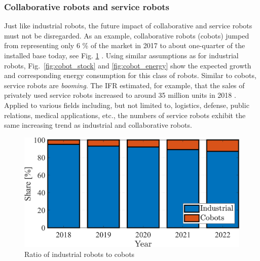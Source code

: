 \subsubsection{Collaborative robots and service robots}
Just like industrial robots, the future impact of collaborative and service robots must not be disregarded. As an example, collaborative robots (cobots) jumped from representing only 6 \% of the market in 2017 to about one-quarter of the installed base today, see Fig. \ref{fig:industrial_cobot_share} \cite{tobe2015}. Using similar assumptions as for industrial robots, Fig.~\ref{fig:cobot_stock} and \ref{fig:cobot_energy} show the expected growth and corresponding energy consumption for this class of robots. Similar to cobots, service robots are \textit{booming}. The IFR estimated, for example, that the sales of privately used service robots increased to around 35 million units in 2018 \cite{IFR2015}. Applied to various fields including, but not limited to, logistics, defense, public relations, medical applications, etc., the numbers of service robots exhibit the same increasing trend as industrial and collaborative robots.
\begin{figure}[!t]
	\centering
	\includegraphics[width= 0.9\columnwidth]{fig/share_industrial_and_cobots.png} 
	\caption{Ratio of industrial robots to cobots \cite{statista_ir_cobot_share}}
	\label{fig:industrial_cobot_share}
\end{figure}
